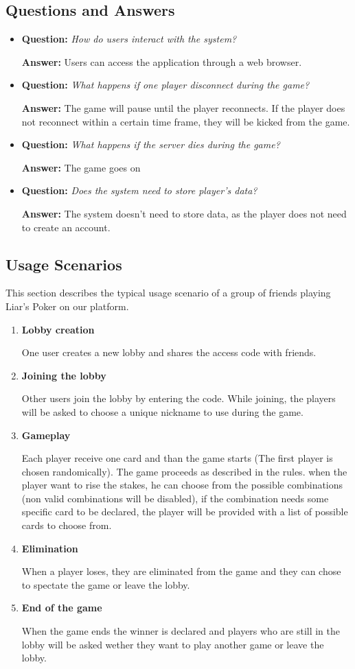 \documentclass{scrartcl}
\begin{document}
\subsection{Questions and Answers}\label{questions-and-answers}
\begin{itemize}
  \item \textbf{Question:} \emph{How do users interact with the system?}\par
        \textbf{Answer:} Users can access the application through a web browser.
  \item \textbf{Question:} \emph{What happens if one player disconnect during the game?}\par
        \textbf{Answer:} The game will pause until the player reconnects. If the player does not reconnect within a certain time frame, they will be kicked from the game.
  \item \textbf{Question:} \emph{What happens if the server dies during the game?}\par
        \textbf{Answer:} The game goes on
  \item \textbf{Question:} \emph{Does the system need to store player's data?}\par
        \textbf{Answer:} The system doesn't need to store data, as the player does not need to create an account.
\end{itemize}
\subsection{Usage Scenarios}\label{usage-scenarios}
This section describes the typical usage scenario of a group of friends playing Liar's Poker on our platform.
\begin{enumerate}
  \item \textbf{Lobby creation}\par
  One user creates a new lobby and shares the access code with friends. 
  \item \textbf{Joining the lobby}\par
  Other users join the lobby by entering the code. While joining, the players will be asked to choose a unique nickname to use during the game.
  \item \textbf{Gameplay}\par
  Each player receive one card and than the game starts (The first player is chosen randomically). The game proceeds as described in the rules. when the player want to rise the stakes, he can choose from the possible combinations (non valid combinations will be disabled), if the combination needs some specific card to be declared, the player will be provided with a list of possible cards to choose from.
  \item \textbf{Elimination}\par
  When a player loses, they are eliminated from the game and they can chose to spectate the game or leave the lobby.
  \item \textbf{End of the game}\par
  When the game ends the winner is declared and players who are still in the lobby will be asked wether they want to play another game or leave the lobby.
\end{enumerate}
\end{document}
